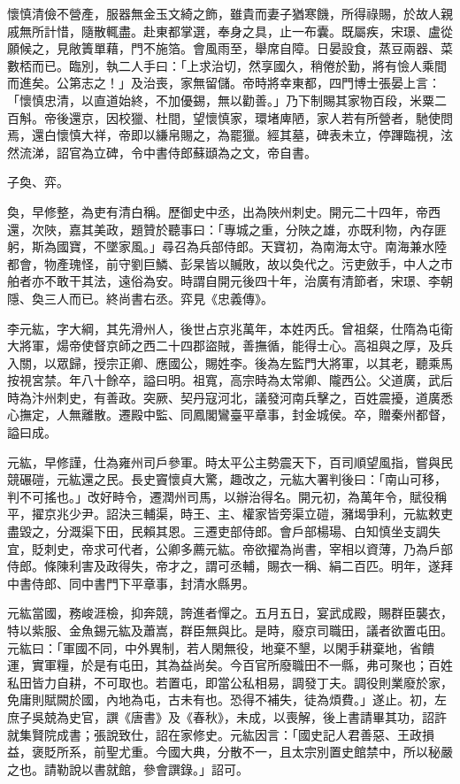 \begin{pinyinscope}
 懷慎清儉不營產，服器無金玉文綺之飾，雖貴而妻子猶寒饑，所得祿賜，於故人親戚無所計惜，隨散輒盡。赴東都掌選，奉身之具，止一布囊。既屬疾，宋璟、盧從願候之，見敞簀單藉，門不施箔。會風雨至，舉席自障。日晏設食，蒸豆兩器、菜數桮而已。臨別，執二人手曰：「上求治切，然享國久，稍倦於勤，將有憸人乘間而進矣。公第志之！」及治喪，家無留儲。帝時將幸東都，四門博士張晏上言：「懷慎忠清，以直道始終，不加優錫，無以勸善。」乃下制賜其家物百段，米粟二百斛。帝後還京，因校獵、杜間，望懷慎家，環堵庳陋，家人若有所營者，馳使問焉，還白懷慎大祥，帝即以縑帛賜之，為罷獵。經其墓，碑表未立，停蹕臨視，泫然流涕，詔官為立碑，令中書侍郎蘇頲為之文，帝自書。



 子奐、弈。



 奐，早修整，為吏有清白稱。歷御史中丞，出為陜州刺史。開元二十四年，帝西還，次陜，嘉其美政，題贊於聽事曰：「專城之重，分陜之雄，亦既利物，內存匪躬，斯為國寶，不墜家風。」尋召為兵部侍郎。天寶初，為南海太守。南海兼水陸都會，物產瑰怪，前守劉巨鱗、彭杲皆以贓敗，故以奐代之。污吏斂手，中人之市舶者亦不敢干其法，遠俗為安。時謂自開元後四十年，治廣有清節者，宋璟、李朝隱、奐三人而已。終尚書右丞。弈見《忠義傳》。



 李元紘，字大綱，其先滑州人，後世占京兆萬年，本姓丙氏。曾祖粲，仕隋為屯衛大將軍，煬帝使督京師之西二十四郡盜賊，善撫循，能得士心。高祖與之厚，及兵入關，以眾歸，授宗正卿、應國公，賜姓李。後為左監門大將軍，以其老，聽乘馬按視宮禁。年八十餘卒，謚曰明。祖寬，高宗時為太常卿、隴西公。父道廣，武后時為汴州刺史，有善政。突厥、契丹寇河北，議發河南兵擊之，百姓震擾，道廣悉心撫定，人無離散。遷殿中監、同鳳閣鸞臺平章事，封金城侯。卒，贈秦州都督，謚曰成。



 元紘，早修謹，仕為雍州司戶參軍。時太平公主勢震天下，百司順望風指，嘗與民競碾磑，元紘還之民。長史竇懷貞大驚，趣改之，元紘大署判後曰：「南山可移，判不可搖也。」改好畤令，遷潤州司馬，以辦治得名。開元初，為萬年令，賦役稱平，擢京兆少尹。詔決三輔渠，時王、主、權家皆旁渠立磑，瀦堨爭利，元紘敕吏盡毀之，分溉渠下田，民賴其恩。三遷吏部侍郎。會戶部楊瑒、白知慎坐支調失宜，貶刺史，帝求可代者，公卿多薦元紘。帝欲擢為尚書，宰相以資薄，乃為戶部侍郎。條陳利害及政得失，帝才之，謂可丞輔，賜衣一稱、絹二百匹。明年，遂拜中書侍郎、同中書門下平章事，封清水縣男。



 元紘當國，務峻涯檢，抑奔競，誇進者憚之。五月五日，宴武成殿，賜群臣襲衣，特以紫服、金魚錫元紘及蕭嵩，群臣無與比。是時，廢京司職田，議者欲置屯田。元紘曰：「軍國不同，中外異制，若人閑無役，地棄不墾，以閑手耕棄地，省饋運，實軍糧，於是有屯田，其為益尚矣。今百官所廢職田不一縣，弗可聚也；百姓私田皆力自耕，不可取也。若置屯，即當公私相易，調發丁夫。調役則業廢於家，免庸則賦闕於國，內地為屯，古未有也。恐得不補失，徒為煩費。」遂止。初，左庶子吳兢為史官，譔《唐書》及《春秋》，未成，以喪解，後上書請畢其功，詔許就集賢院成書；張說致仕，詔在家修史。元紘因言：「國史記人君善惡、王政損益，褒貶所系，前聖尤重。今國大典，分散不一，且太宗別置史館禁中，所以秘嚴之也。請勒說以書就館，參會譔錄。」詔可。




\end{pinyinscope}
